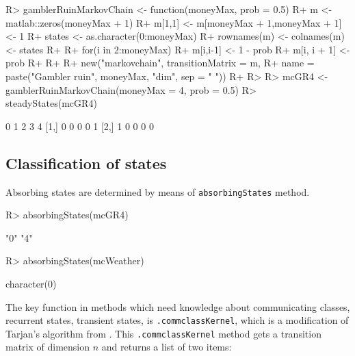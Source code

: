 \documentclass[
  nojss]{jss}
\begin{document}
\begin{CodeChunk}

\begin{CodeInput}
R> gamblerRuinMarkovChain <- function(moneyMax, prob = 0.5) {
R+   m <- matlab::zeros(moneyMax + 1)
R+   m[1,1] <- m[moneyMax + 1,moneyMax + 1] <- 1
R+   states <- as.character(0:moneyMax)
R+   rownames(m) <- colnames(m) <- states
R+   
R+   for(i in 2:moneyMax){ 
R+     m[i,i-1] <- 1 - prob
R+     m[i, i + 1] <- prob   
R+   }
R+   
R+   new("markovchain", transitionMatrix = m, 
R+       name = paste("Gambler ruin", moneyMax, "dim", sep = " "))
R+ }
R> 
R> mcGR4 <- gamblerRuinMarkovChain(moneyMax = 4, prob = 0.5)
R> steadyStates(mcGR4)
\end{CodeInput}

\begin{CodeOutput}
     0 1 2 3 4
[1,] 0 0 0 0 1
[2,] 1 0 0 0 0
\end{CodeOutput}
\end{CodeChunk}

\hypertarget{classification-of-states}{%
\subsection{Classification of states}\label{classification-of-states}}

Absorbing states are determined by means of \texttt{absorbingStates} method.

\begin{CodeChunk}

\begin{CodeInput}
R> absorbingStates(mcGR4)
\end{CodeInput}

\begin{CodeOutput}
[1] "0" "4"
\end{CodeOutput}

\begin{CodeInput}
R> absorbingStates(mcWeather)
\end{CodeInput}

\begin{CodeOutput}
character(0)
\end{CodeOutput}
\end{CodeChunk}

The key function in methods which need knowledge about communicating classes, recurrent states, transient
states, is \texttt{.commclassKernel}, which is a modification of Tarjan's algorithm from \cite{Tarjan}. This
\texttt{.commclassKernel} method gets a transition matrix of dimension \(n\) and returns a list of two items:
\end{document}
